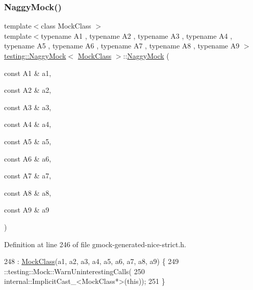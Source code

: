 \subsubsection{\texorpdfstring{Naggy\+Mock()}{NaggyMock()}\hspace{0.1cm}{\footnotesize\ttfamily [10/11]}}
{\footnotesize\ttfamily template$<$class Mock\+Class $>$ \\
template$<$typename A1 , typename A2 , typename A3 , typename A4 , typename A5 , typename A6 , typename A7 , typename A8 , typename A9 $>$ \\
\hyperlink{classtesting_1_1NaggyMock}{testing\+::\+Naggy\+Mock}$<$ \hyperlink{classMockClass}{Mock\+Class} $>$\+::\hyperlink{classtesting_1_1NaggyMock}{Naggy\+Mock} (\begin{DoxyParamCaption}\item[{const A1 \&}]{a1,  }\item[{const A2 \&}]{a2,  }\item[{const A3 \&}]{a3,  }\item[{const A4 \&}]{a4,  }\item[{const A5 \&}]{a5,  }\item[{const A6 \&}]{a6,  }\item[{const A7 \&}]{a7,  }\item[{const A8 \&}]{a8,  }\item[{const A9 \&}]{a9 }\end{DoxyParamCaption})\hspace{0.3cm}{\ttfamily [inline]}}



Definition at line 246 of file gmock-\/generated-\/nice-\/strict.\+h.


\begin{DoxyCode}
248                     : \hyperlink{classMockClass}{MockClass}(a1, a2, a3, a4, a5, a6, a7, a8, a9) \{
249     ::testing::Mock::WarnUninterestingCalls(
250         internal::ImplicitCast\_<MockClass*>(\textcolor{keyword}{this}));
251   \}
\end{DoxyCode}
\mbox{\label{classtesting_1_1NaggyMock_aa40a39806b939f423696f9380de3172b}} 
